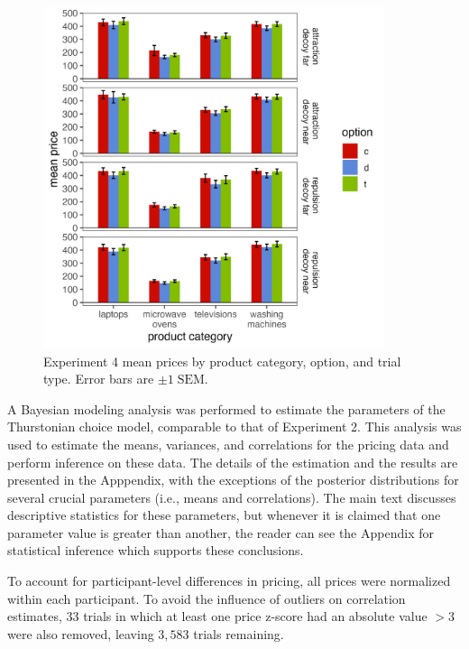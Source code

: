 \begin{figure}
    \includegraphics[width=100mm,scale=0.5]{figures/price_m_by_effect_category.jpeg}
    \caption{Experiment 4 mean prices by product category, option, and trial type. Error bars are $\pm 1\;\text{SEM}$.}
    \label{fig:price_m_by_effect_category}
\end{figure}

A Bayesian modeling analysis was performed to estimate the parameters of the Thurstonian choice model, comparable to that of Experiment 2. This analysis was used to estimate the means, variances, and correlations for the pricing data and perform inference on these data. The details of the estimation and the results are presented in the Apppendix, with the exceptions of the posterior distributions for several crucial parameters (i.e., means and correlations). The main text discusses descriptive statistics for these parameters, but whenever it is claimed that one parameter value is greater than another, the reader can see the Appendix for statistical inference which supports these conclusions. 

To account for participant-level differences in pricing, all prices were normalized within each participant. To avoid the influence of outliers on correlation estimates, $33$ trials in which at least one price z-score had an absolute value $>3$ were also removed, leaving $3,583$ trials remaining. 

